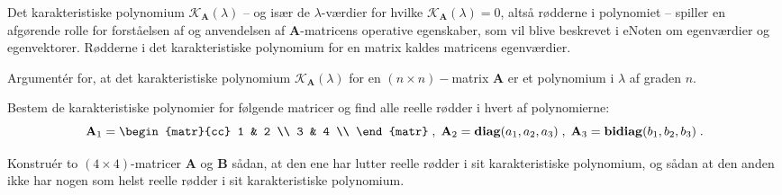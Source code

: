 \begin{info}
Det karakteristiske polynomium $\mathcal{K}_{\mathbf{A}}(\lambda)$ -- og især de $\lambda$-værdier for hvilke $\mathcal{K}_{\mathbf{A}}(\lambda) = 0$, altså rødderne i polynomiet -- spiller en afgørende rolle for forståelsen af og anvendelsen af $\mathbf{A}$-matricens operative egenskaber, som vil blive beskrevet i eNoten om egenværdier og egenvektorer. Rødderne i det karakteristiske polynomium for en matrix kaldes matricens egenværdier.
\end{info}

\begin{exercise}
Argument\'{e}r for, at det karakteristiske polynomium $\mathcal{K}_{\mathbf{A}}(\lambda)$ for en $(n \times n)-$matrix $\mathbf{A}$ er et polynomium i $\lambda$ af graden $n$.
\end{exercise}

\begin{exercise}
Bestem de karakteristiske polynomier for følgende matricer og find alle reelle rødder i hvert af polynomierne:
\begin{equation}
\mathbf{A}_{1} = \begin{matr}{cc}
                 1 & 2 \\
                 3 & 4 \\
               \end{matr} \;, \;\mathbf{A}_{2} = \diag(a_{1}, a_{2}, a_{3})\;, \;\mathbf{A}_{3} = \bidiag(b_{1}, b_{2}, b_{3}) \; .
\end{equation}
\end{exercise}

\begin{exercise}
Konstruér to $(4 \times 4)$-matricer $\mathbf{A}$ og $\mathbf{B}$  sådan, at den ene har lutter reelle rødder i sit karakteristiske polynomium, og sådan at den anden ikke har nogen som helst reelle rødder i sit karakteristiske polynomium.
\end{exercise}


